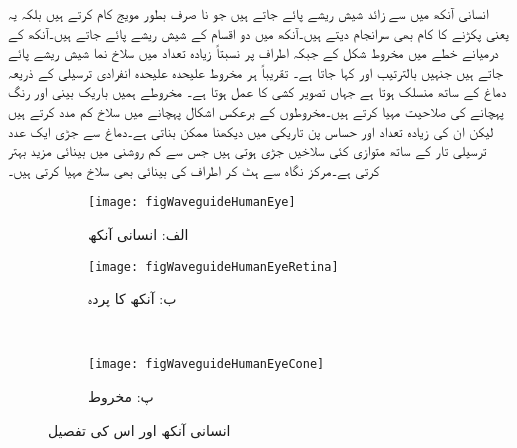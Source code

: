 انسانی آنکھ میں  سے زائد شیش ریشے پائے جاتے ہیں جو نا صرف بطور مویج کام کرتے ہیں بلکہ یہ  یعنی  پکڑنے کا کام بھی سرانجام دیتے ہیں۔آنکھ میں دو اقسام کے شیش ریشے پائے جاتے ہیں۔آنکھ کے درمیانے خطے میں مخروط شکل کے  جبکہ اطراف پر نسبتاً زیادہ تعداد میں سلاخ نما شیش ریشے پائے جاتے ہیں جنہیں بالترتیب  اور   کہا جاتا ہے۔ تقریباً ہر مخروط علیحدہ علیحدہ انفرادی ترسیلی  کے ذریعہ دماغ کے ساتھ منسلک ہوتا ہے جہاں تصویر کشی کا عمل ہوتا ہے۔ مخروطے ہمیں باریک بینی اور رنگ پہچانے کی صلاحیت مہیا کرتے ہیں۔مخروطوں کے برعکس اشکال پہچانے میں سلاخ کم مدد کرتے ہیں لیکن ان کی زیادہ تعداد اور حساس پن  تاریکی میں دیکھنا ممکن بناتی ہے۔دماغ سے جڑی ایک عدد ترسیلی تار کے ساتھ متوازی کئی سلاخیں جڑی ہوتی ہیں جس سے کم روشنی میں بینائی مزید بہتر کرتی ہے۔مرکز نگاہ سے ہٹ کر اطراف کی بینائی بھی سلاخ مہیا کرتی ہیں۔  

\begin{figure}
\centering
\begin{subfigure}{0.5\textwidth}
\centering
\texttt{[image: figWaveguideHumanEye]}
\caption*{الف: انسانی آنکھ}
\label{شکل_مویج_انسانی_آنکھ_مکمل_شکل}
\end{subfigure}%
\begin{subfigure}{0.5\textwidth}
\centering
\texttt{[image: figWaveguideHumanEyeRetina]}
\caption*{ب: آنکھ کا پردہ}
\label{شکل_مویج_انسانی_آنکھ_کا_پردہ}
\end{subfigure}%
\\
\begin{subfigure}{1\textwidth}
\centering
\texttt{[image: figWaveguideHumanEyeCone]}
\caption*{پ: مخروط}
\label{شکل_مویج_انسانی_آنکھ_مخروط}
\end{subfigure}%
\caption{انسانی آنکھ اور اس کی تفصیل}
\label{شکل_مویج_انسانی_آنکھ}
\end{figure}

